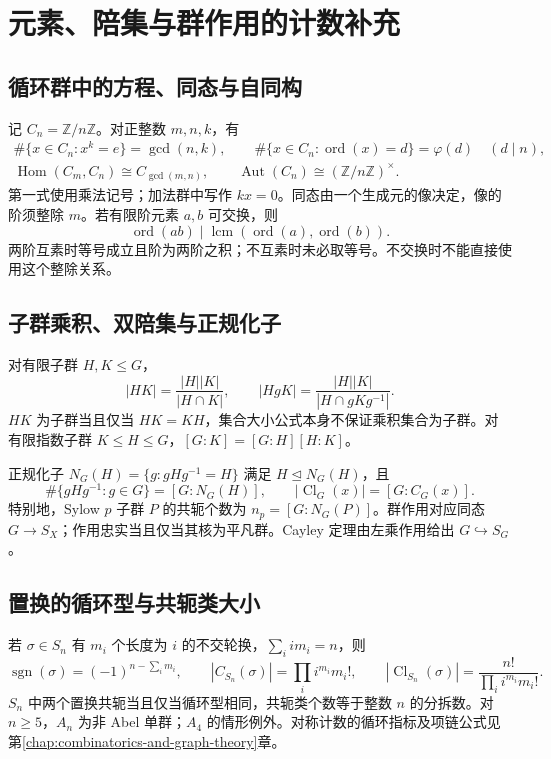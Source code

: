 \documentclass[../main.tex]{subfiles}
\begin{document}
\section{元素、陪集与群作用的计数补充}
\subsection{循环群中的方程、同态与自同构}
记 $C_n=\mathbb Z/n\mathbb Z$。对正整数 $m,n,k$，有
\begin{gather*}
\#\{x\in C_n:x^k=e\}=\gcd(n,k),\qquad
\#\{x\in C_n:\operatorname{ord}(x)=d\}=\varphi(d)\quad(d\mid n),\\
\operatorname{Hom}(C_m,C_n)\cong C_{\gcd(m,n)},\qquad
\operatorname{Aut}(C_n)\cong(\mathbb Z/n\mathbb Z)^\times.
\end{gather*}
第一式使用乘法记号；加法群中写作 $kx=0$。同态由一个生成元的像决定，像的阶须整除 $m$。若有限阶元素 $a,b$ 可交换，则
\[
\operatorname{ord}(ab)\mid\operatorname{lcm}(\operatorname{ord}(a),\operatorname{ord}(b)).
\]
两阶互素时等号成立且阶为两阶之积；不互素时未必取等号。不交换时不能直接使用这个整除关系。

\subsection{子群乘积、双陪集与正规化子}
对有限子群 $H,K\le G$，
\[
|HK|=\frac{|H||K|}{|H\cap K|},\qquad
|HgK|=\frac{|H||K|}{|H\cap gKg^{-1}|}.
\]
$HK$ 为子群当且仅当 $HK=KH$，集合大小公式本身不保证乘积集合为子群。对有限指数子群 $K\le H\le G$，$[G:K]=[G:H][H:K]$。

正规化子 $N_G(H)=\{g:gHg^{-1}=H\}$ 满足 $H\trianglelefteq N_G(H)$，且
\[
\#\{gHg^{-1}:g\in G\}=[G:N_G(H)],\qquad
|\operatorname{Cl}_G(x)|=[G:C_G(x)].
\]
特别地，Sylow $p$ 子群 $P$ 的共轭个数为 $n_p=[G:N_G(P)]$。群作用对应同态 $G\to S_X$；作用忠实当且仅当其核为平凡群。Cayley 定理由左乘作用给出 $G\hookrightarrow S_G$。

\subsection{置换的循环型与共轭类大小}
若 $\sigma\in S_n$ 有 $m_i$ 个长度为 $i$ 的不交轮换，$\sum_i i m_i=n$，则
\[
\operatorname{sgn}(\sigma)=(-1)^{n-\sum_i m_i},\qquad
|C_{S_n}(\sigma)|=\prod_i i^{m_i}m_i!,\qquad
|\operatorname{Cl}_{S_n}(\sigma)|=\frac{n!}{\prod_i i^{m_i}m_i!}.
\]
$S_n$ 中两个置换共轭当且仅当循环型相同，共轭类个数等于整数 $n$ 的分拆数。对 $n\ge5$，$A_n$ 为非 Abel 单群；$A_4$ 的情形例外。对称计数的循环指标及项链公式见第\ref{chap:combinatorics-and-graph-theory}章。
\end{document}
